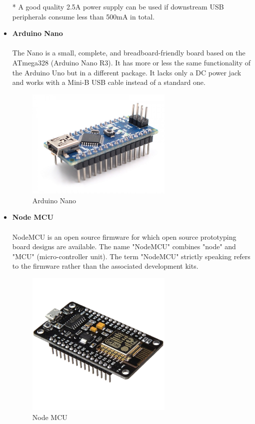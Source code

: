 \begin{itemize}[wide, labelwidth=!, labelindent=0pt]
    * A good quality 2.5A power supply can be used if downstream USB peripherals consume less than 500mA in total.
    
    \newpage
    
    \item \textbf{Arduino Nano}
    \vspace{-0.5cm}
    \paragraph{}The Nano is a small, complete, and breadboard-friendly board based on the ATmega328 (Arduino Nano R3). It has more or less the same functionality of the Arduino Uno but in a different package. It lacks only a DC power jack and works with a Mini-B USB cable instead of a standard one.
    
    \begin{figure}[H]
    \centering
    \includegraphics[width = 7cm]{project/images/arduino nano.jpg}
    \caption{Arduino Nano}
    \end{figure}
    
    \item \textbf{Node MCU}
    \vspace{-0.5cm}
    \paragraph{}NodeMCU is an open source firmware for which open source prototyping board designs are available. The name "NodeMCU" combines "node" and "MCU" (micro-controller unit). The term "NodeMCU" strictly speaking refers to the firmware rather than the associated development kits.
    
    \begin{figure}[H]
    \centering
    \includegraphics[width = 7cm]{project/images/nodemcu.png}
    \caption{Node MCU}
    \end{figure}
\end{itemize}

